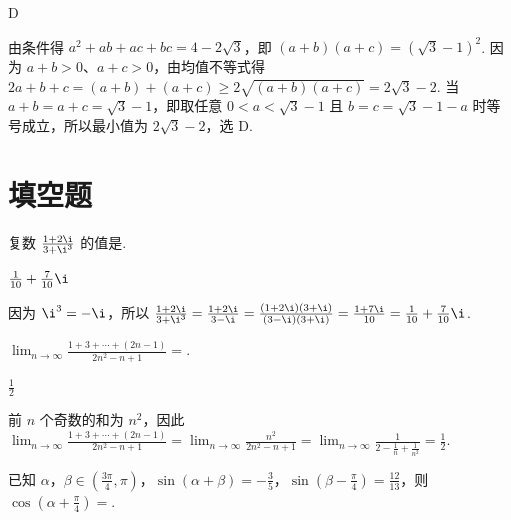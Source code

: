 \begin{answer}
D
\end{answer}

\begin{solution}
由条件得 \(a^{2}+ab+ac+bc=4-2\sqrt3\)，即 \((a+b)(a+c)=(\sqrt3-1)^{2}\). 因为 \(a+b>0\)、\(a+c>0\)，由均值不等式得 \(2a+b+c=(a+b)+(a+c)\geqslant2\sqrt{(a+b)(a+c)}=2\sqrt3-2\). 当 \(a+b=a+c=\sqrt3-1\)，即取任意 \(0<a<\sqrt3-1\) 且 \(b=c=\sqrt3-1-a\) 时等号成立，所以最小值为 \(2\sqrt3-2\)，选 D.
\end{solution}

\section{填空题}
\begin{problem}
复数 \(\frac{1 + 2\i}{3 + \i^3}\) 的值是\fillinblank{}.
\end{problem}

\begin{answer}
\(\frac{1}{10} + \frac{7}{10}\i\)
\end{answer}

\begin{solution}
因为 \(\i^{3}=-\i\)，所以 \(\frac{1+2\i}{3+\i^{3}}=\frac{1+2\i}{3-\i}=\frac{(1+2\i)(3+\i)}{(3-\i)(3+\i)}=\frac{1+7\i}{10}=\frac{1}{10}+\frac{7}{10}\i\).
\end{solution}

\begin{problem}
\(\displaystyle\lim_{n\to \infty}\frac{1 + 3 + \cdots + (2n - 1)}{2n^2 - n + 1} =\)\fillinblank{}.
\end{problem}

\begin{answer}
\(\frac{1}{2}\)
\end{answer}

\begin{solution}
前 \(n\) 个奇数的和为 \(n^{2}\)，因此 \(\displaystyle\lim_{n\to\infty}\frac{1+3+\cdots+(2n-1)}{2n^{2}-n+1}=\lim_{n\to\infty}\frac{n^{2}}{2n^{2}-n+1}=\lim_{n\to\infty}\frac{1}{2-\frac1n+\frac1{n^{2}}}=\frac12\).
\end{solution}

\begin{problem}
已知 \(\alpha\)，\(\beta \in \left(\frac{3\pi}{4}, \pi\right)\)，\(\sin (\alpha + \beta) = -\frac{3}{5}\)，\(\sin \left(\beta - \frac{\pi}{4}\right) = \frac{12}{13}\)，则 \(\cos \left(\alpha + \frac{\pi}{4}\right) =\)\fillinblank{}.
\end{problem}


